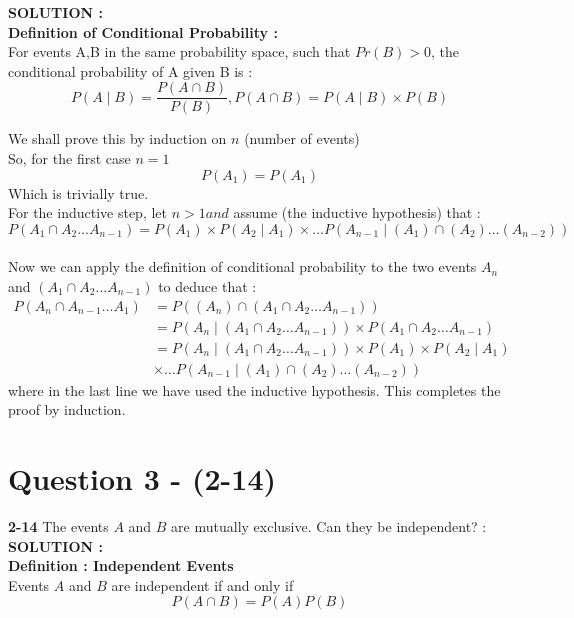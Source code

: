 \documentclass{article}
\begin{document}
\hspace{1em} \large{\textbf{SOLUTION :}} \\
\textbf{Definition of Conditional Probability :}\\
For events A,B in the same probability space, such that $Pr(B) > 0$, the conditional probability of A given B is : \\
$$P(A \mid B) = \frac{P(A \cap B)}{P(B)} ,
P(A \cap B) = P(A \mid B) \times P(B) $$

 
We shall prove this by induction on $n$ (number of events)\\
So, for the first case $ n = 1 $ \\
$$P(A_1) = P(A_1)$$
Which is trivially true. \\
For the inductive step, let $n > 1 and$ assume (the inductive hypothesis) that : \\
$$P(A_1 \cap A_2 \dots A_{n-1}) = P(A_1) \times P(A_2 \mid A_1) \times \dots P(A_{n-1} \mid (A_1) \cap (A_2) \dots (A_{n-2})) $$ \\
Now we can apply the definition of conditional probability to the two events $A_n$ and $(A_1 \cap A_2 \dots A_{n-1})$ to deduce that : \\
\begin{align*}
	P(A_n \cap A_{n-1} \dots A_1) &= P((A_n) \cap (A_1 \cap A_2 \dots A_{n-1})) \\
	&= P(A_n \mid (A_1 \cap A_2 \dots A_{n-1})) \times P(A_1 \cap A_2 \dots A_{n-1}) \\
	&= P(A_n \mid (A_1 \cap A_2 \dots A_{n-1})) \times P(A_1) \times P(A_2 \mid A_1) \\ &\times \dots P(A_{n-1} \mid (A_1) \cap (A_2) \dots (A_{n-2})) 
\end{align*}
where in the last line we have used the inductive hypothesis. This completes the proof by induction.

\section{Question 3 - (2-14)}
\label{Q3}
\textbf{2-14}  The events $A$ and $B$ are mutually exclusive. Can they be independent?  : \\

\hspace{1em} \large{\textbf{SOLUTION :}} \\

\textbf{Definition : Independent Events} \\
Events $A$ and $B$ are independent if and only if \\
$$P(A \cap B) = P(A) P(B)  $$
\end{document}
